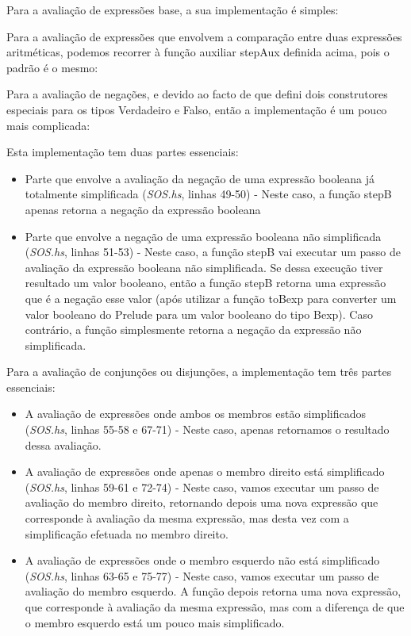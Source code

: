 \documentclass[11pt,a4paper]{report}
\begin{document}
\par Para a avaliação de expressões base, a sua implementação é simples:

\par Para a avaliação de expressões que envolvem a comparação entre duas expressões aritméticas, podemos recorrer à função auxiliar stepAux definida acima, pois o padrão é o mesmo:

\par Para a avaliação de negações, e devido ao facto de que defini dois construtores especiais para os tipos Verdadeiro e Falso, então a implementação é um pouco mais complicada:
\par Esta implementação tem duas partes essenciais:
\begin{itemize}
    \item Parte que envolve a avaliação da negação de uma expressão booleana já totalmente simplificada (\textit{SOS.hs}, linhas 49-50) - Neste caso, a função stepB apenas retorna a negação da expressão booleana
    \item Parte que envolve a negação de uma expressão booleana não simplificada (\textit{SOS.hs}, linhas 51-53) - Neste caso, a função stepB vai executar um passo de avaliação da expressão booleana não simplificada. Se dessa execução tiver resultado um valor booleano, então a função stepB retorna uma expressão que é a negação esse valor (após utilizar a função toBexp para converter um valor booleano do Prelude para um valor booleano do tipo Bexp). Caso contrário, a função simplesmente retorna a negação da expressão não simplificada.
\end{itemize}

\par Para a avaliação de conjunções ou disjunções, a implementação tem três partes essenciais:
\begin{itemize}
    \item A avaliação de expressões onde ambos os membros estão simplificados (\textit{SOS.hs}, linhas 55-58 e 67-71) - Neste caso, apenas retornamos o resultado dessa avaliação.
    \item A avaliação de expressões onde apenas o membro direito está simplificado (\textit{SOS.hs}, linhas 59-61 e 72-74) - Neste caso, vamos executar um passo de avaliação do membro direito, retornando depois uma nova expressão que corresponde à avaliação da mesma expressão, mas desta vez com a simplificação efetuada no membro direito.
    \item A avaliação de expressões onde o membro esquerdo não está simplificado (\textit{SOS.hs}, linhas 63-65 e 75-77) - Neste caso, vamos executar um passo de avaliação do membro esquerdo. A função depois retorna uma nova expressão, que corresponde à avaliação da mesma expressão, mas com a diferença de que o membro esquerdo está um pouco mais simplificado.
\end{itemize}
\end{document}
